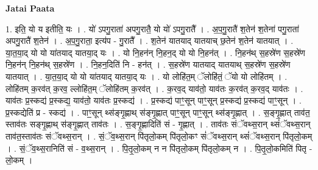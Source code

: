\documentclass[17pt]{extarticle}
\begin{document}
\textbf{Jatai Paata} \newline

1. इति॒ यो य इतीति॒ यः । . यो॑ ऽपगु॒राता॑ अपगु॒रातै॒ यो यो॑ ऽपगु॒रातै᳚ । . अ॒प॒गु॒रातै॑ श॒तेन॑ श॒तेना॑ पगु॒राता॑ अपगु॒रातै॑ श॒तेन॑ । . अ॒प॒गु॒राता॒ इत्य॑प - गु॒रातै᳚ । . श॒तेन॑ यातयाद् यातयाच् छ॒तेन॑ श॒तेन॑ यातयात् । . या॒त॒या॒द् यो यो या॑तयाद् यातया॒द् यः । . यो नि॒हन॑न् नि॒हन॒द् यो यो नि॒हन॑त् । . नि॒हन॑थ् स॒हस्रे॑ण स॒हस्रे॑ण नि॒हन॑न् नि॒हन॑थ् स॒हस्रे॑ण । . नि॒हन॒दिति॑ नि - हन॑त् । . स॒हस्रे॑ण यातयाद् यातयाथ् स॒हस्रे॑ण स॒हस्रे॑ण यातयात् । . या॒त॒या॒द् यो यो या॑तयाद् यातया॒द् यः । . यो लोहि॑त॒म् ॅलोहि॑तं॒ ॅयो यो लोहि॑तम् । . लोहि॑तम् क॒रव॑त् क॒रव॒ ल्लोहि॑त॒म् ॅलोहि॑तम् क॒रव॑त् । . क॒रव॒द् याव॑तो॒ याव॑तः क॒रव॑त् क॒रव॒द् याव॑तः । . याव॑तः प्र॒स्कद्य॑ प्र॒स्कद्य॒ याव॑तो॒ याव॑तः प्र॒स्कद्य॑ । . प्र॒स्कद्य॑ पाꣳ॒॒सून् पाꣳ॒॒सून् प्र॒स्कद्य॑ प्र॒स्कद्य॑ पाꣳ॒॒सून् । . प्र॒स्कद्येति॑ प्र - स्कद्य॑ । . पाꣳ॒॒सून् थ्स॑ङ्गृ॒ह्णाथ् स॑ङ्गृ॒ह्णात् पाꣳ॒॒सून् पाꣳ॒॒सून् थ्स॑ङ्गृ॒ह्णात् । . स॒ङ्गृ॒ह्णात् ताव॑त॒ स्ताव॑तः सङ्गृ॒ह्णाथ् स॑ङ्गृ॒ह्णात् ताव॑तः । . स॒ङ्गृ॒ह्णादिति॑ सं - गृ॒ह्णात् । . ताव॑तः संॅवथ्स॒रान् थ्सं॑ॅवथ्स॒रान् ताव॑त॒स्ताव॑तः संॅवथ्स॒रान् । . सं॒ॅव॒थ्स॒रान् पि॑तृलो॒कम् पि॑तृलो॒कꣳ सं॑ॅवथ्स॒रान् थ्सं॑ॅवथ्स॒रान् पि॑तृलो॒कम् । . सं॒ॅव॒थ्स॒रानिति॑ सं - व॒थ्स॒रान् । . पि॒तृ॒लो॒कम् न न पि॑तृलो॒कम् पि॑तृलो॒कम् न । . पि॒तृ॒लो॒कमिति॑ पितृ - लो॒कम् । \newline
\end{document}
